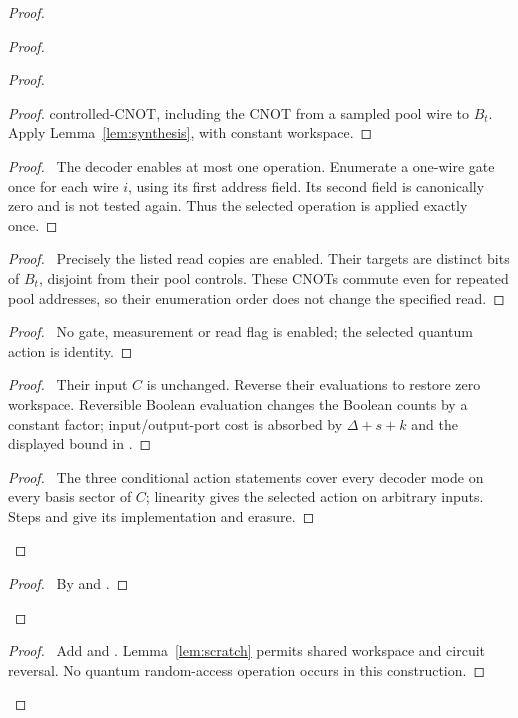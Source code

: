 \begin{proof}
\begin{proof}
\begin{proof}
\begin{proof}
 controlled-CNOT, including the CNOT from a sampled pool wire to
 $B_t$. Apply Lemma~\ref{lem:synthesis}, with constant workspace.
 \end{proof}
 \begin{proof}\pf\ The decoder enables at most one operation.
 Enumerate a one-wire gate once for each wire $i$, using its first
 address field. Its second field is canonically zero and is not
 tested again. Thus the selected operation is applied exactly once.
 \end{proof}
 \begin{proof}\pf\ Precisely the listed read copies are enabled.
 Their targets are distinct bits of $B_t$, disjoint from their pool
 controls. These CNOTs commute even for repeated pool addresses,
 so their enumeration order does not change the specified read.
 \end{proof}
 \begin{proof}\pf\ No gate, measurement or read flag is enabled;
 the selected quantum action is identity.\end{proof}
 \begin{proof}\pf\ Their input $C$ is unchanged. Reverse their
 evaluations to restore zero workspace. Reversible Boolean evaluation
 changes the Boolean counts by a constant factor; input/output-port
 cost is absorbed by $\Delta+s+k$ and the displayed bound in
 .\end{proof}
 \qedstep
 \begin{proof}\pf\ The three conditional action statements cover
 every decoder mode on every basis sector of $C$; linearity gives
 the selected action on arbitrary inputs. Steps
  and 
 give its implementation and erasure.\end{proof}
\end{proof}
  \qedstep
  \begin{proof}\pf\ By  and
  .\end{proof}
 \end{proof}
 \qedstep
 \begin{proof}\pf\ Add  and
 . Lemma~\ref{lem:scratch} permits shared
 workspace and circuit reversal. No quantum random-access operation
 occurs in this construction.\end{proof}
\end{proof}

